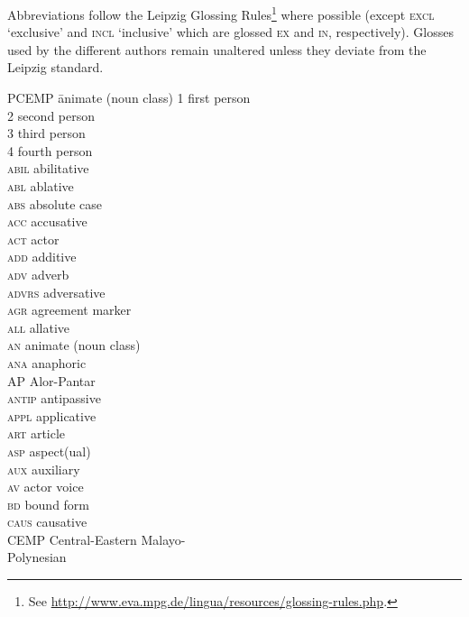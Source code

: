 
Abbreviations follow the Leipzig Glossing Rules\footnote{See \url{http://www.eva.mpg.de/lingua/resources/glossing-rules.php}.} where possible (except \textsc{excl} `exclusive' and \textsc{incl} `inclusive' which are glossed \textsc{ex} and \textsc{in}, respectively). Glosses used by the different authors remain unaltered unless they deviate from the Leipzig standard.

\largerpage
\begin{multicols}{2}
\begin{tabbing}
  PCEMP \hspace{.5em} \= animate (noun class)\kill
 \textsc{1}  \> first person \\
 \textsc{2}  \> second person \\
 \textsc{3}  \> third person \\
 \textsc{4}  \> fourth person \\
 \textsc{abil}  \> abilitative \\
 \textsc{abl}  \> ablative \\
 \textsc{abs}  \> absolute case \\
 \textsc{acc}  \> accusative \\
 \textsc{act}  \> actor \\
 \textsc{add}  \> additive \\
 \textsc{adv}  \> adverb \\
 \textsc{advrs} \> adversative \\
 \textsc{agr}  \> agreement marker \\
 \textsc{all}  \> allative \\
 \textsc{an}  \> animate (noun class) \\
 \textsc{ana}  \> anaphoric \\
 \textsc{AP}  \> Alor-Pantar \\
 \textsc{antip}  \> antipassive \\
 \textsc{appl}  \> applicative \\
 \textsc{art}  \> article \\
 \textsc{asp}  \> aspect(ual) \\
 \textsc{aux}  \> auxiliary \\
 \textsc{av}  \> actor voice \\
 \textsc{bd}  \> bound form \\
 \textsc{caus}  \> causative \\
 \textsc{CEMP}  \> Central-Eastern Malayo-\\\>Polynesian \\

\end{tabbing}
\end{multicols}
